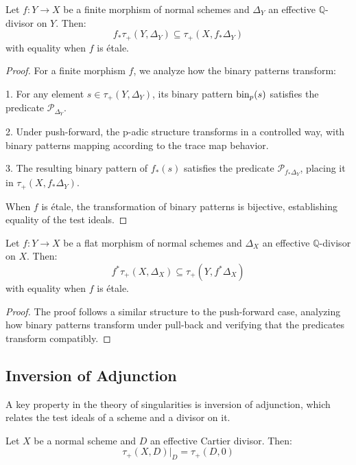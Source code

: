\begin{proposition}\label{prop:push-forward}
Let $f: Y \to X$ be a finite morphism of normal schemes and $\Delta_Y$ an effective $\mathbb{Q}$-divisor on $Y$. Then:
$$f_*\tau_+(Y,\Delta_Y) \subseteq \tau_+(X,f_*\Delta_Y)$$
with equality when $f$ is étale.
\end{proposition}

\begin{proof}
For a finite morphism $f$, we analyze how the binary patterns transform:

1. For any element $s \in \tau_+(Y,\Delta_Y)$, its binary pattern $\operatorname{bin}_p(s)$ satisfies the predicate $\mathcal{P}_{\Delta_Y}$.

2. Under push-forward, the p-adic structure transforms in a controlled way, with binary patterns mapping according to the trace map behavior.

3. The resulting binary pattern of $f_*(s)$ satisfies the predicate $\mathcal{P}_{f_*\Delta_Y}$, placing it in $\tau_+(X,f_*\Delta_Y)$.

When $f$ is étale, the transformation of binary patterns is bijective, establishing equality of the test ideals.
\end{proof}

\begin{proposition}\label{prop:pull-back}
Let $f: Y \to X$ be a flat morphism of normal schemes and $\Delta_X$ an effective $\mathbb{Q}$-divisor on $X$. Then:
$$f^*\tau_+(X,\Delta_X) \subseteq \tau_+(Y,f^*\Delta_X)$$
with equality when $f$ is étale.
\end{proposition}

\begin{proof}
The proof follows a similar structure to the push-forward case, analyzing how binary patterns transform under pull-back and verifying that the predicates transform compatibly.
\end{proof}

\subsection{Inversion of Adjunction}

A key property in the theory of singularities is inversion of adjunction, which relates the test ideals of a scheme and a divisor on it.

\begin{theorem}\label{thm:inversion-adjunction}
Let $X$ be a normal scheme and $D$ an effective Cartier divisor. Then:
$$\tau_+(X,D)|_D = \tau_+(D,0)$$
\end{theorem}


